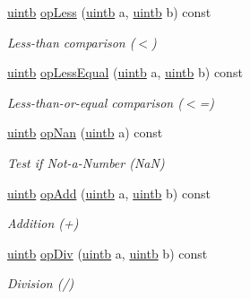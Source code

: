 \begin{DoxyCompactItemize}
\mbox{\hyperlink{types_8h_a2db313c5d32a12b01d26ac9b3bca178f}{uintb}} \mbox{\hyperlink{class_float_format_a257b216d9b9e5aad3b693df46624cc6d}{op\+Less}} (\mbox{\hyperlink{types_8h_a2db313c5d32a12b01d26ac9b3bca178f}{uintb}} a, \mbox{\hyperlink{types_8h_a2db313c5d32a12b01d26ac9b3bca178f}{uintb}} b) const
\begin{DoxyCompactList}\small\item\em Less-\/than comparison ($<$) \end{DoxyCompactList}\item 
\mbox{\hyperlink{types_8h_a2db313c5d32a12b01d26ac9b3bca178f}{uintb}} \mbox{\hyperlink{class_float_format_adaf425a89e09270969f6fd848bf06025}{op\+Less\+Equal}} (\mbox{\hyperlink{types_8h_a2db313c5d32a12b01d26ac9b3bca178f}{uintb}} a, \mbox{\hyperlink{types_8h_a2db313c5d32a12b01d26ac9b3bca178f}{uintb}} b) const
\begin{DoxyCompactList}\small\item\em Less-\/than-\/or-\/equal comparison ($<$=) \end{DoxyCompactList}\item 
\mbox{\hyperlink{types_8h_a2db313c5d32a12b01d26ac9b3bca178f}{uintb}} \mbox{\hyperlink{class_float_format_a64576b3f398b049f002a6c95e45f2296}{op\+Nan}} (\mbox{\hyperlink{types_8h_a2db313c5d32a12b01d26ac9b3bca178f}{uintb}} a) const
\begin{DoxyCompactList}\small\item\em Test if Not-\/a-\/\+Number (NaN) \end{DoxyCompactList}\item 
\mbox{\hyperlink{types_8h_a2db313c5d32a12b01d26ac9b3bca178f}{uintb}} \mbox{\hyperlink{class_float_format_ad342814d842cb20b16dbe4fc9af59e1e}{op\+Add}} (\mbox{\hyperlink{types_8h_a2db313c5d32a12b01d26ac9b3bca178f}{uintb}} a, \mbox{\hyperlink{types_8h_a2db313c5d32a12b01d26ac9b3bca178f}{uintb}} b) const
\begin{DoxyCompactList}\small\item\em Addition (+) \end{DoxyCompactList}\item 
\mbox{\hyperlink{types_8h_a2db313c5d32a12b01d26ac9b3bca178f}{uintb}} \mbox{\hyperlink{class_float_format_abcd8caf82f65bac1e32be3cecd9f80e3}{op\+Div}} (\mbox{\hyperlink{types_8h_a2db313c5d32a12b01d26ac9b3bca178f}{uintb}} a, \mbox{\hyperlink{types_8h_a2db313c5d32a12b01d26ac9b3bca178f}{uintb}} b) const
\begin{DoxyCompactList}\small\item\em Division (/) \end{DoxyCompactList}\item 

\end{DoxyCompactItemize}
